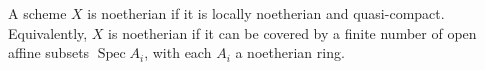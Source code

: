 A scheme $X$ is noetherian if it is locally noetherian and quasi-compact. Equivalently, $X$ is noetherian if it can be covered by a finite number of open affine subsets $\operatorname{Spec} A_i$, with each $A_i$ a noetherian ring.
